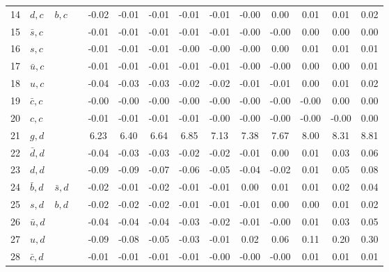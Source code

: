 \begin{tabularx}{\textwidth}{rXXX@{}S@{}S@{}S@{}S@{}S@{}S@{}S@{}S@{}S@{}S}
 14 & $d, c$           & $b, c$            &                  & -0.02 & -0.01 & -0.01 & -0.01 & -0.01 & -0.00 &  0.00 &  0.01 &  0.01 &  0.02 \\
 15 & $\bar s, c$      &                   &                  & -0.01 & -0.01 & -0.01 & -0.01 & -0.01 & -0.00 & -0.00 &  0.00 &  0.00 &  0.00 \\
 16 & $s, c$           &                   &                  & -0.01 & -0.01 & -0.01 & -0.00 & -0.00 & -0.00 &  0.00 &  0.01 &  0.01 &  0.01 \\
 17 & $\bar u, c$      &                   &                  & -0.01 & -0.01 & -0.01 & -0.01 & -0.01 & -0.00 & -0.00 &  0.00 &  0.00 &  0.01 \\
 18 & $u, c$           &                   &                  & -0.04 & -0.03 & -0.03 & -0.02 & -0.02 & -0.01 & -0.01 &  0.00 &  0.01 &  0.02 \\
 19 & $\bar c, c$      &                   &                  & -0.00 & -0.00 & -0.00 & -0.00 & -0.00 & -0.00 & -0.00 & -0.00 &  0.00 &  0.00 \\
 20 & $c, c$           &                   &                  & -0.01 & -0.01 & -0.01 & -0.01 & -0.00 & -0.00 & -0.00 & -0.00 & -0.00 &  0.00 \\
 21 & $g, d$           &                   &                  &  6.23 &  6.40 &  6.64 &  6.85 &  7.13 &  7.38 &  7.67 &  8.00 &  8.31 &  8.81 \\
 22 & $\bar d, d$      &                   &                  & -0.04 & -0.03 & -0.03 & -0.02 & -0.02 & -0.01 &  0.00 &  0.01 &  0.03 &  0.06 \\
 23 & $d, d$           &                   &                  & -0.09 & -0.09 & -0.07 & -0.06 & -0.05 & -0.04 & -0.02 &  0.01 &  0.05 &  0.08 \\
 24 & $\bar b, d$      & $\bar s, d$       &                  & -0.02 & -0.01 & -0.02 & -0.01 & -0.01 &  0.00 &  0.01 &  0.01 &  0.02 &  0.04 \\
 25 & $s, d$           & $b, d$            &                  & -0.02 & -0.02 & -0.02 & -0.01 & -0.01 & -0.01 &  0.00 &  0.00 &  0.01 &  0.02 \\
 26 & $\bar u, d$      &                   &                  & -0.04 & -0.04 & -0.04 & -0.03 & -0.02 & -0.01 & -0.00 &  0.01 &  0.03 &  0.05 \\
 27 & $u, d$           &                   &                  & -0.09 & -0.08 & -0.05 & -0.03 & -0.01 &  0.02 &  0.06 &  0.11 &  0.20 &  0.30 \\
 28 & $\bar c, d$      &                   &                  & -0.01 & -0.01 & -0.01 & -0.01 & -0.00 & -0.00 & -0.00 &  0.01 &  0.01 &  0.01 \\

\end{tabularx}
